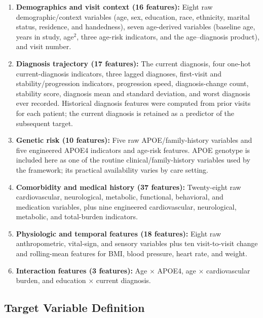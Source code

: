 \documentclass[preprint,12pt]{elsarticle}
\begin{document}
\begin{enumerate}
    \item \textbf{Demographics and visit context (16 features):} Eight raw demographic/context variables (age, sex, education, race, ethnicity, marital status, residence, and handedness), seven age-derived variables (baseline age, years in study, age$^2$, three age-risk indicators, and the age--diagnosis product), and visit number.

    \item \textbf{Diagnosis trajectory (17 features):} The current diagnosis, four one-hot current-diagnosis indicators, three lagged diagnoses, first-visit and stability/progression indicators, progression speed, diagnosis-change count, stability score, diagnosis mean and standard deviation, and worst diagnosis ever recorded. Historical diagnosis features were computed from prior visits for each patient; the current diagnosis is retained as a predictor of the subsequent target.

    \item \textbf{Genetic risk (10 features):} Five raw APOE/family-history variables and five engineered APOE4 indicators and age-risk features. APOE genotype is included here as one of the routine clinical/family-history variables used by the framework; its practical availability varies by care setting.

    \item \textbf{Comorbidity and medical history (37 features):} Twenty-eight raw cardiovascular, neurological, metabolic, functional, behavioral, and medication variables, plus nine engineered cardiovascular, neurological, metabolic, and total-burden indicators.

    \item \textbf{Physiologic and temporal features (18 features):} Eight raw anthropometric, vital-sign, and sensory variables plus ten visit-to-visit change and rolling-mean features for BMI, blood pressure, heart rate, and weight.

    \item \textbf{Interaction features (3 features):} Age $\times$ APOE4, age $\times$ cardiovascular burden, and education $\times$ current diagnosis.
\end{enumerate}

\subsection{Target Variable Definition}
\end{document}
